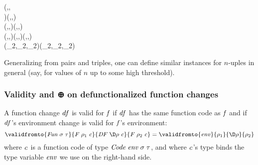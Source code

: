\begin{hscode}\SaveRestoreHook
{}%
%
%
%
\>[B]{}\;({}\<[13]%
\>[13]{}\;,\;,{}\<[E]%
\\
\>[13]{}\;)\Rightarrow{}\;(,,)\;\<[E]%
\\[\blanklineskip]%
\>[B]{}\<[3]%
\>[3]{}\;\Delta (,,)\mathrel{=}(\Delta {},\Delta {},\Delta {}){}\<[E]%
\\
\>[B]{}\<[3]%
\>[3]{}(,,)\oplus (,,)\mathrel{=}(\oplus {},\oplus {},\oplus {}){}\<[E]%
\\
\>[B]{}\<[3]%
\>[3]{}\;(_{2},_{2},_{2})\mathrel{=}(\;_{2},\;_{2},\;_{2}){}\<[E]%
\ColumnHook
\end{hscode}\resethooks

Generalizing from pairs and triples, one can define similar instances for
$n$-uples in general (say, for values of $n$ up to some high threshold).
%


\subsubsection{Validity and ⊕ on defunctionalized function changes}
A function change \ensuremath{\Varid{df}} is valid for \ensuremath{\Varid{f}} if \ensuremath{\Varid{df}} has the same function code as
\ensuremath{\Varid{f}} and if \ensuremath{\Varid{df}}'s environment change is valid for \ensuremath{\Varid{f}}'s environment:
\[\ensuremath{\validfromto{\Conid{Fun}\;\sigma\;\tau}{\Conid{F}\;\rho_{1}\;\Varid{c}}{\Conid{DF}\;\D\rho\;\Varid{c}}{\Conid{F}\;\rho_{2}\;\Varid{c}}\mathrel{=}\validfromto{\Varid{env}}{\rho_{1}}{\D\rho}{\rho_{2}}}\] where \ensuremath{\Varid{c}} is a function code of type \ensuremath{\Conid{Code}\;\Varid{env}\;\sigma\;\tau}, and
where \ensuremath{\Varid{c}}'s type binds the type variable \ensuremath{\Varid{env}} we use on the right-hand side.

